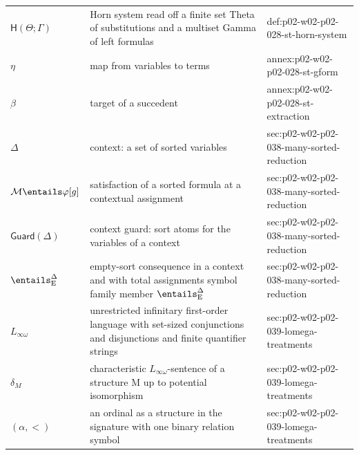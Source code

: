 \begin{longtable}{@{}p{}p{}p{}@{}}
\(\mathsf H(\Theta;\allowbreak \Gamma)\) & Horn system read off a finite set Theta of substitutions and a multiset Gamma of left formulas & def:\allowbreak{}p02-\allowbreak{}w02-\allowbreak{}p02-\allowbreak{}028-\allowbreak{}st-\allowbreak{}horn-\allowbreak{}system \\
\(\eta\) & map from variables to terms & annex:\allowbreak{}p02-\allowbreak{}w02-\allowbreak{}p02-\allowbreak{}028-\allowbreak{}st-\allowbreak{}gform \\
\(\beta\) & target of a succedent & annex:\allowbreak{}p02-\allowbreak{}w02-\allowbreak{}p02-\allowbreak{}028-\allowbreak{}st-\allowbreak{}extraction \\
\(\Delta\) & context: a set of sorted variables & sec:\allowbreak{}p02-\allowbreak{}w02-\allowbreak{}p02-\allowbreak{}038-\allowbreak{}many-\allowbreak{}sorted-\allowbreak{}reduction \\
\(\mathcal M\entails\varphi[g]\) & satisfaction of a sorted formula at a contextual assignment & sec:\allowbreak{}p02-\allowbreak{}w02-\allowbreak{}p02-\allowbreak{}038-\allowbreak{}many-\allowbreak{}sorted-\allowbreak{}reduction \\
\(\mathsf{Guard}(\Delta)\) & context guard: sort atoms for the variables of a context & sec:\allowbreak{}p02-\allowbreak{}w02-\allowbreak{}p02-\allowbreak{}038-\allowbreak{}many-\allowbreak{}sorted-\allowbreak{}reduction \\
\(\entails^{\Delta}_{\mathrm E}\) & empty-sort consequence in a context and with total assignments symbol family member \(\entails^{\Delta}_{\mathrm E}\) & sec:\allowbreak{}p02-\allowbreak{}w02-\allowbreak{}p02-\allowbreak{}038-\allowbreak{}many-\allowbreak{}sorted-\allowbreak{}reduction \\
\(L_{\infty\omega}\) & unrestricted infinitary first-order language with set-sized conjunctions and disjunctions and finite quantifier strings & sec:\allowbreak{}p02-\allowbreak{}w02-\allowbreak{}p02-\allowbreak{}039-\allowbreak{}lomega-\allowbreak{}treatments \\
\(\delta_M\) & characteristic \(L_{\infty\omega}\)-sentence of a structure M up to potential isomorphism & sec:\allowbreak{}p02-\allowbreak{}w02-\allowbreak{}p02-\allowbreak{}039-\allowbreak{}lomega-\allowbreak{}treatments \\
\((\alpha,\allowbreak <)\) & an ordinal as a structure in the signature with one binary relation symbol & sec:\allowbreak{}p02-\allowbreak{}w02-\allowbreak{}p02-\allowbreak{}039-\allowbreak{}lomega-\allowbreak{}treatments \\

\end{longtable}

